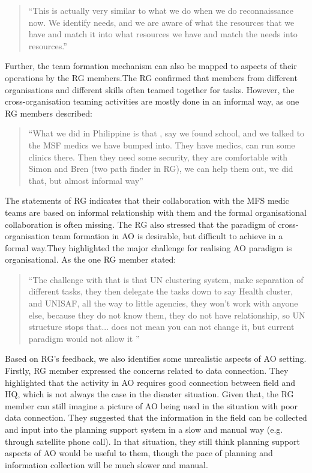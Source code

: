 \begin{quotation}
``This is actually very similar to what we do when we do reconnaissance now. We identify needs, and we are aware of what the resources that we have and match it into what resources we have and match the needs into resources.''\\
\end{quotation}

Further, the team formation mechanism can also be mapped to aspects of their operations by the RG members.The RG confirmed that members from different organisations and different skills often teamed together for tasks. However, the cross-organisation teaming activities are mostly done in an informal way, as one RG members described: \\

\begin{quotation}
``What we did in Philippine is that , say we found school, and we talked to the MSF medics we have bumped into. They have medics, can run some clinics there. Then they need some security, they are comfortable with Simon and Bren (two path finder in RG), we can help them out, we did that, but almost informal way'' \\
\end{quotation}

The statements of RG indicates that their collaboration with the MFS medic teams are based on informal  relationship with them and the formal organisational collaboration is often missing. The RG also stressed that the paradigm of cross-organisation team formation in AO is desirable, but difficult to achieve in a formal way.They highlighted the major challenge for realising AO paradigm is organisational. As the one RG member stated:\\

\begin{quotation}
``The challenge with that is that UN clustering system, make separation of different tasks, they then delegate the tasks down to say Health cluster, and UNISAF, all the way to little agencies, they won't work with anyone else, because they do not know them, they do not have relationship, so UN structure stops that... does not mean you can not change it, but current paradigm would not allow it ''
\end{quotation}

Based on RG's feedback, we also identifies some unrealistic aspects of AO setting. Firstly, RG member expressed the concerns related to data connection. They highlighted that the activity in AO requires good connection between field and HQ, which is not always the case in the disaster situation. Given that, the RG member can still imagine a picture of AO being used in the situation with poor data connection. They suggested that the information in the field can be collected and input into the planning support system in a slow and manual way (e.g. through satellite phone call). In that situation, they still think planning support aspects of AO would be useful to them, though the pace of planning and information collection will be much slower and manual. \\

